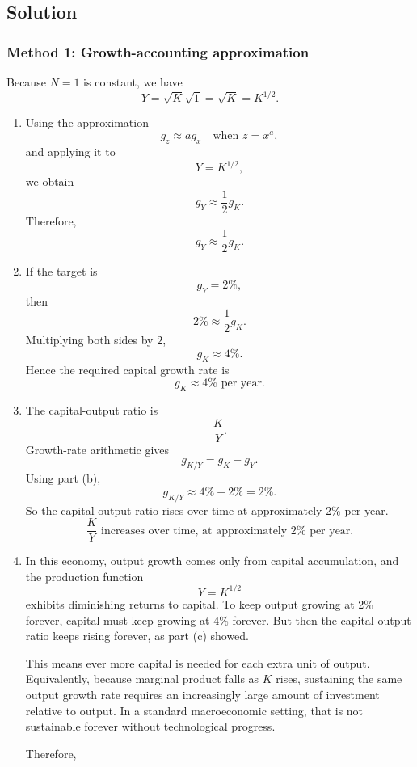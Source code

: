 \documentclass[12pt]{article}
\begin{document}
\subsection{Solution}

\subsubsection{Method 1: Growth-accounting approximation}
Because \(N=1\) is constant, we have
\[
Y=\sqrt{K}\sqrt{1}=\sqrt{K}=K^{1/2}.
\]

\begin{enumerate}[label=(\alph*)]
    \item
    Using the approximation
    \[
    g_z\approx ag_x \quad \text{when } z=x^a,
    \]
    and applying it to
    \[
    Y=K^{1/2},
    \]
    we obtain
    \[
    g_Y\approx \frac{1}{2}g_K.
    \]
    Therefore,
    \[
    \boxed{g_Y\approx \frac{1}{2}g_K.}
    \]

    \item
    If the target is
    \[
    g_Y=2\%,
    \]
    then
    \[
    2\%\approx \frac{1}{2}g_K.
    \]
    Multiplying both sides by \(2\),
    \[
    g_K\approx 4\%.
    \]
    Hence the required capital growth rate is
    \[
    \boxed{g_K\approx 4\%\text{ per year.}}
    \]

    \item
    The capital-output ratio is
    \[
    \frac{K}{Y}.
    \]
    Growth-rate arithmetic gives
    \[
    g_{K/Y}=g_K-g_Y.
    \]
    Using part (b),
    \[
    g_{K/Y}\approx 4\%-2\%=2\%.
    \]
    So the capital-output ratio rises over time at approximately 2\% per year.
    \[
    \boxed{\frac{K}{Y}\text{ increases over time, at approximately }2\%\text{ per year.}}
    \]

    \item
    In this economy, output growth comes only from capital accumulation, and the production function
    \[
    Y=K^{1/2}
    \]
    exhibits diminishing returns to capital. To keep output growing at 2\% forever, capital must keep growing at 4\% forever. But then the capital-output ratio keeps rising forever, as part (c) showed.

    This means ever more capital is needed for each extra unit of output. Equivalently, because marginal product falls as \(K\) rises, sustaining the same output growth rate requires an increasingly large amount of investment relative to output. In a standard macroeconomic setting, that is not sustainable forever without technological progress.

    Therefore,
    \begin{center}
    \end{center}
\end{enumerate}
\end{document}
